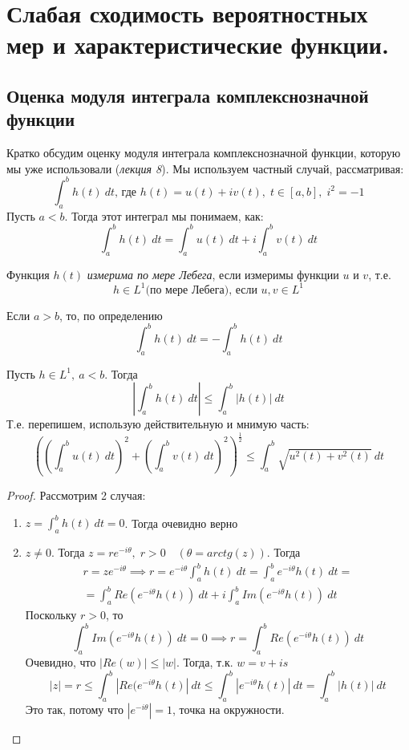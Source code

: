 \section{Слабая сходимость вероятностных мер и характеристические функции.}
\subsection{Оценка модуля интеграла комплекснозначной функции}
Кратко обсудим оценку модуля интеграла комплекснозначной функции, которую мы уже использовали (\emph{лекция 8}). Мы используем частный случай, рассматривая:
$$\int_a^b h(t) \: dt\mbox{, где } h(t) = u(t) + iv(t),\; t \in [a, b],\; i^2 = -1$$
Пусть $a < b$. Тогда этот интеграл мы понимаем, как:
$$\int_a^b h(t) \:dt = \int_a^b u(t) \:dt + i\int_a^b v(t) \:dt$$
\begin{definition} \label{lect12:def1}
    Функция $h(t)$ \emph{измерима по мере Лебега}, если измеримы функции $u$ и $v$, т.е. 
    $$h \in L^1 \mbox{(по мере Лебега), если } u, v \in L^1$$
\end{definition}
\begin{nb}
    Если $a > b$, то, по определению
$$\int_a^b h(t) \:dt = -\int_a^b h(t)\: dt$$
\end{nb}
\begin{lemma} \label{lect12:lem1}
    Пусть $h\in L^1, \:a < b$. Тогда
    $$\left| \int_a^b h(t) \:dt\right| \leqslant \int_a^b |h(t)| \:dt$$
    Т.е. перепишем, использую действительную и мнимую часть:
    $$\left(\left(\int_a^b u(t)\: dt\right)^2 + \left(\int_a^b v(t) \:dt\right) ^2\right)^{\frac{1}{2}} \leqslant \int_a^b \sqrt{u^2(t) + v^2(t)} \: dt$$
\end{lemma}
\begin{proof}
    Рассмотрим 2 случая:
    \begin{enumerate}
        \item $z = \int_a^b h(t) \: dt = 0$. Тогда очевидно верно
        \item $z \ne 0$. Тогда $z = re^{-i\theta},\; r >0 \quad(\theta = arctg(z))$. Тогда
         \begin{multline*}
            r = ze^{-i\theta} \implies r = e^{-i\theta}\int_a^b h(t) \:dt = \int_a^b e^{-i\theta} h(t) \: dt = \\=\int_a^b Re(e^{-i\theta} h(t)) \: dt + i \int_a^b Im(e^{-i\theta} h(t)) \: dt 
        \end{multline*}
    Поскольку $r>0$, то
    $$\int_a^b Im(e^{-i\theta} h(t)) \: dt =0 \implies r = \int_a^b Re(e^{-i\theta} h(t)) \: dt $$
    Очевидно, что $\left| Re(w)\right| \leqslant |w|$. Тогда, т.к. $w = v + is$
    $$|z| = r \leqslant \int_a^b \left|Re(e^{-i\theta} h(t) \right| \:dt \leqslant \int_a^b |e^{-i\theta} h(t)| \:dt = \int_a^b |h(t)| \:dt$$
    Это так, потому что $|e^{-i\theta}| = 1$, точка на окружности.
    \end{enumerate}
\end{proof}
